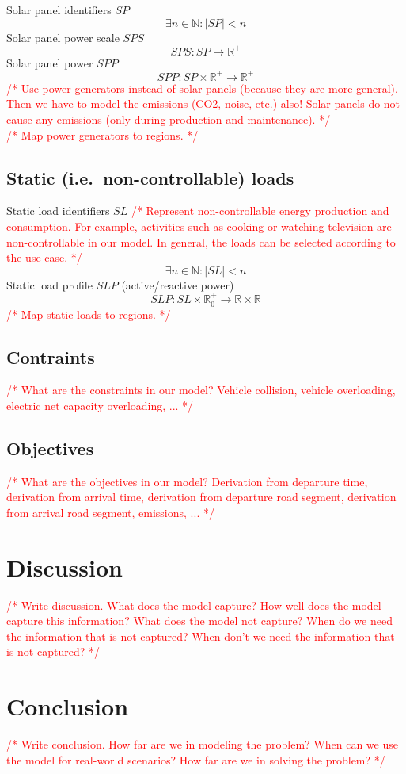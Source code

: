 \documentclass[conference]{IEEEtran}
\newcommand{\todo}[1]{\textcolor{red}{/* #1 */}}
\begin{document}
	Solar panel identifiers $SP$
	\[
		\exists n \in \mathbb{N} : |SP| < n
	\]
	Solar panel power scale $SPS$ 
	\[
		SPS : SP \rightarrow \mathbb{R}^+
	\]
	Solar panel power $SPP$ 
	\[
		SPP : SP \times \mathbb{R}^+ \rightarrow \mathbb{R}^+
	\]
	\todo{Use power generators instead of solar panels (because they are more general). Then we have to model the emissions (CO2, noise, etc.) also! Solar panels do not cause any emissions (only during production and maintenance).}
	\\
	\todo{Map power generators to regions.}
	
	\subsection{Static (i.e.\ non-controllable) loads}
	\label{static_loads}
	
	Static load identifiers $SL$ \todo{Represent non-controllable energy production and consumption. For example, activities such as cooking or watching television are non-controllable in our model. In general, the loads can be selected according to the use case.}
	\[
		\exists n \in \mathbb{N} : |SL| < n
	\]
	Static load profile $SLP$ (active/reactive power)
	\[
		SLP : SL \times \mathbb{R}_0^+ \rightarrow \mathbb{R} \times \mathbb{R}
	\]
	\todo{Map static loads to regions.}
	
	\subsection{Contraints}
	
	\todo{What are the constraints in our model? Vehicle collision, vehicle overloading, electric net capacity overloading, ...}
	
	\subsection{Objectives}
	
	\todo{What are the objectives in our model? Derivation from departure time, derivation from arrival time, derivation from departure road segment, derivation from arrival road segment, emissions, ...}
	
	\section{Discussion}
	\label{discussion}
	
	\todo{Write discussion. What does the model capture? How well does the model capture this information? What does the model not capture? When do we need the information that is not captured? When don't we need the information that is not captured?}
	
	\section{Conclusion}
	\label{conclusion}
	
	\todo{Write conclusion. How far are we in modeling the problem? When can we use the model for real-world scenarios? How far are we in solving the problem?}
	
	
	
	
\end{document}
